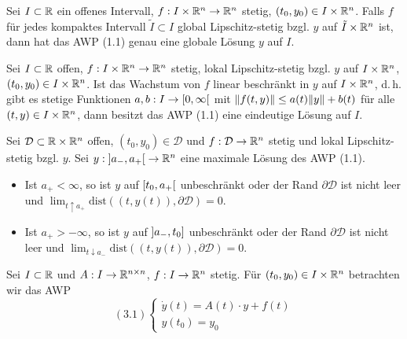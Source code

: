 \documentclass{cheat-sheet}
\newcommand{\D}{\mathcal{D}}
\newcommand{\dist}{\mathrm{dist}} %
\begin{document}

\begin{satz}
  Sei $I \subset \mathbb{R}$ ein offenes Intervall, $f : I \times \mathbb{R}^n \to \mathbb{R}^n$ stetig, $(t_0, y_0) \in I \times \mathbb{R}^n$. Falls $f$ für jedes kompaktes Intervall $\tilde{I} \subset I$ global Lipschitz-stetig bzgl. $y$ auf $\tilde{I} \times \mathbb{R}^n$ ist, dann hat das AWP (1.1) genau eine globale Lösung $y$ auf $I$.
\end{satz}

\begin{satz}
  Sei $I \subset \mathbb{R}$ offen, $f : I \times \mathbb{R}^n \to \mathbb{R}^n$ stetig, lokal Lipschitz-stetig bzgl. $y$ auf $I \times \mathbb{R}^n$, $(t_0, y_0) \in I \times \mathbb{R}^n$. Ist das Wachstum von $f$ linear beschränkt in $y$ auf $I \times \mathbb{R}^n$, d.\,h. gibt es stetige Funktionen $a, b : I \to \left[ 0, \infty \right[$ mit $\lVert f(t, y)\rVert \leq a(t) \lVert y\rVert + b(t)$ für alle $(t, y) \in I \times \mathbb{R}^n$, dann besitzt das AWP (1.1) eine eindeutige Lösung auf $I$.
\end{satz}



\begin{satz}
  Sei $\D \subset \R \times \R^n$ offen, $(t_0, y_0) \in \D$ und $f : \D \to \R^n$ stetig und lokal Lipschitz-stetig bzgl. $y$. Sei $y : \left] a_-, a_+ \right[ \to \mathbb{R}^n$ eine maximale Lösung des AWP (1.1).
  \begin{itemize}
    \item Ist $a_+ < \infty$, so ist $y$ auf $\left[ t_0, a_+ \right[$ unbeschränkt
    oder der Rand $\partial \D$ ist nicht
    leer und $\lim_{t \uparrow a_+} \dist((t, y(t)), \partial \D) = 0$.
    \item Ist $a_+ > -\infty$, so ist $y$ auf $\left] a_-, t_0 \right]$ unbeschränkt oder der Rand $\partial \D$ ist nicht leer und $\lim_{t \downarrow a_-} \dist((t, y(t)), \partial \D) = 0$.
  \end{itemize}
\end{satz}




\begin{prob}
  Sei $I \subset \mathbb{R}$ und $A : I \to \mathbb{R}^{n \times n}$, $f : I \to \mathbb{R}^n$ stetig. Für $(t_0, y_0) \in I \times \mathbb{R}^n$ betrachten wir das AWP
  \[
    (3.1) \left\{ \begin{array}{l}
    \dot{y}(t) = A(t) \cdot y + f(t)\\
    y(t_0) = y_0
    \end{array} \right.
  \]
\end{prob}
\end{document}

